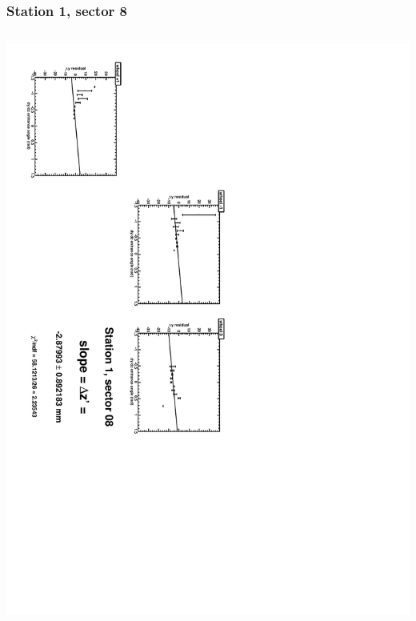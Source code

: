 \documentclass[compress]{beamer}
\begin{document}
\begin{frame}
\frametitle{Station 1, sector 8}
\begin{columns}
\includegraphics[height=\linewidth, angle=90]{zfits/zfit_1_08.pdf}


\end{columns}
\end{frame}
\end{document}
